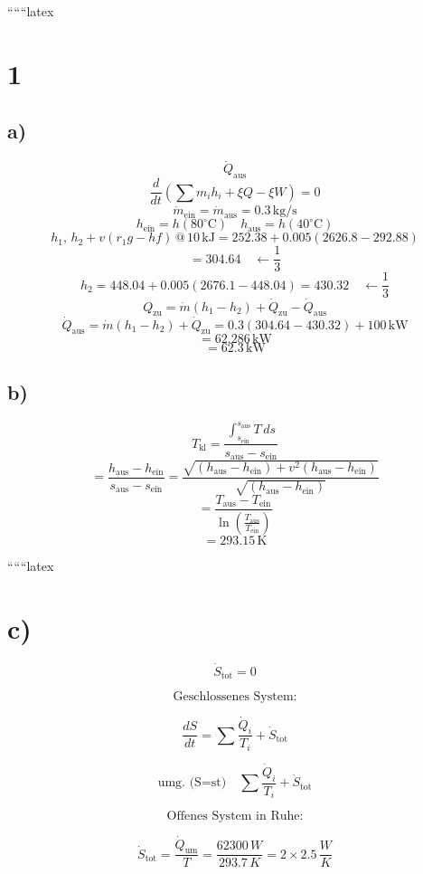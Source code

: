 
``````latex


\section*{1}
\subsection*{a)}
\[
\dot{Q}_{\text{aus}}
\]
\[
\frac{d}{dt} \left( \sum m_i h_i + \xi Q - \xi W \right) = 0
\]
\[
\dot{m}_{\text{ein}} = \dot{m}_{\text{aus}} = 0.3 \, \text{kg/s}
\]
\[
h_{\text{ein}} = h(80^\circ \text{C}) \quad h_{\text{aus}} = h(40^\circ \text{C})
\]
\[
h_1, \, h_2 + v(r_1 g - h f) \, @ \, 10 \, \text{kJ} = 252.38 + 0.005 (2626.8 - 292.88)
\]
\[
= 304.64 \quad \leftarrow \frac{1}{3}
\]
\[
h_2 = 448.04 + 0.005 (2676.1 - 448.04) = 430.32 \quad \leftarrow \frac{1}{3}
\]
\[
Q_{\text{zu}} = \dot{m} (h_1 - h_2) + \dot{Q}_{\text{zu}} - \dot{Q}_{\text{aus}}
\]
\[
\dot{Q}_{\text{aus}} = \dot{m} (h_1 - h_2) + \dot{Q}_{\text{zu}} = 0.3 (304.64 - 430.32) + 100 \, \text{kW}
\]
\[
= 62.286 \, \text{kW}
\]
\[
= 62.3 \, \text{kW}
\]

\subsection*{b)}
\[
T_{\text{kl}} = \frac{\int_{s_{\text{ein}}}^{s_{\text{aus}}} T \, ds}{s_{\text{aus}} - s_{\text{ein}}}
\]
\[
= \frac{h_{\text{aus}} - h_{\text{ein}}}{s_{\text{aus}} - s_{\text{ein}}} = \frac{\sqrt{(h_{\text{aus}} - h_{\text{ein}}) + v^2 (h_{\text{aus}} - h_{\text{ein}})}}{\sqrt{(h_{\text{aus}} - h_{\text{ein}})}}
\]
\[
= \frac{T_{\text{aus}} - T_{\text{ein}}}{\ln \left( \frac{T_{\text{aus}}}{T_{\text{ein}}} \right)}
\]
\[
= 293.15 \, \text{K}
\]

``````latex


\section*{c)}

\[
\dot{S}_{\text{tot}} = 0
\]

\[
\text{Geschlossenes System:}
\]

\[
\frac{dS}{dt} = \sum \frac{\dot{Q}_i}{T_i} + \dot{S}_{\text{tot}}
\]

\[
\text{umg. (S=st)} \quad \sum \frac{\dot{Q}_i}{T_i} + \dot{S}_{\text{tot}}
\]

\[
\text{Offenes System in Ruhe:}
\]

\[
\dot{S}_{\text{tot}} = \frac{\dot{Q}_{\text{um}}}{T} = \frac{62300 \, W}{293.7 \, K} = 2 \times 2.5 \, \frac{W}{K}
\]

